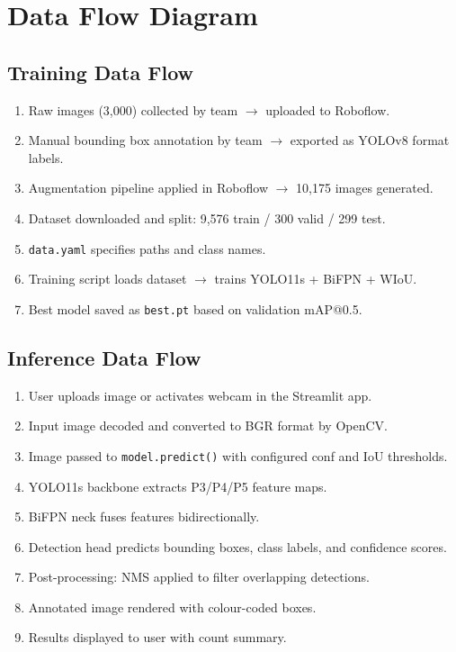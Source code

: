 \section{Data Flow Diagram}

\subsection{Training Data Flow}

\begin{enumerate}
    \item Raw images (3,000) collected by team $\rightarrow$ uploaded to Roboflow.
    \item Manual bounding box annotation by team $\rightarrow$ exported as YOLOv8 format labels.
    \item Augmentation pipeline applied in Roboflow $\rightarrow$ 10,175 images generated.
    \item Dataset downloaded and split: 9,576 train / 300 valid / 299 test.
    \item \texttt{data.yaml} specifies paths and class names.
    \item Training script loads dataset $\rightarrow$ trains YOLO11s + BiFPN + WIoU.
    \item Best model saved as \texttt{best.pt} based on validation mAP@0.5.
\end{enumerate}

\subsection{Inference Data Flow}

\begin{enumerate}
    \item User uploads image or activates webcam in the Streamlit app.
    \item Input image decoded and converted to BGR format by OpenCV.
    \item Image passed to \texttt{model.predict()} with configured conf and IoU thresholds.
    \item YOLO11s backbone extracts P3/P4/P5 feature maps.
    \item BiFPN neck fuses features bidirectionally.
    \item Detection head predicts bounding boxes, class labels, and confidence scores.
    \item Post-processing: NMS applied to filter overlapping detections.
    \item Annotated image rendered with colour-coded boxes.
    \item Results displayed to user with count summary.
\end{enumerate}

